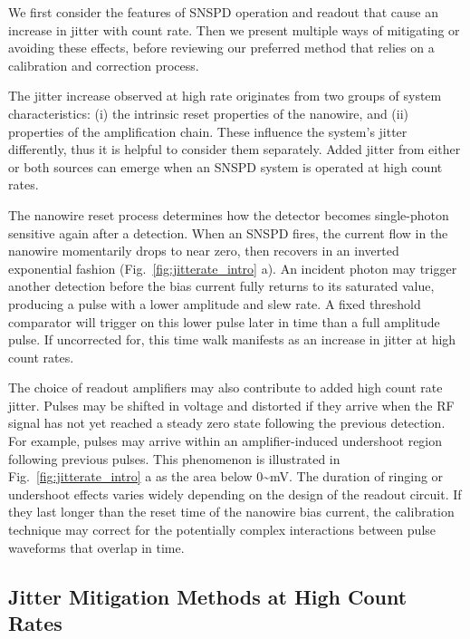 \documentclass[11pt]{caltech_thesis} %
\begin{document}
We first consider the features of SNSPD operation and readout that cause
an increase in jitter with count rate. Then we present multiple ways of
mitigating or avoiding these effects, before reviewing our preferred
method that relies on a calibration and correction process.

The jitter increase observed at high rate originates from two groups of
system characteristics: (i) the intrinsic reset properties of the
nanowire, and (ii) properties of the amplification chain. These
influence the system's jitter differently, thus it is helpful to
consider them separately. Added jitter from either or both sources can
emerge when an SNSPD system is operated at high count rates.

The nanowire reset process determines how the detector becomes
single-photon sensitive again after a detection. When an SNSPD fires,
the current flow in the nanowire momentarily drops to near zero, then
recovers in an inverted exponential fashion
(Fig.~\ref{fig:jitterate_intro} a). An incident photon may trigger
another detection before the bias current fully returns to its saturated
value, producing a pulse with a lower amplitude and slew rate. A fixed
threshold comparator will trigger on this lower pulse later in time than
a full amplitude pulse. If uncorrected for, this time walk manifests as
an increase in jitter at high count rates.

The choice of readout amplifiers may also contribute to added high count
rate jitter. Pulses may be shifted in voltage and distorted if they
arrive when the RF signal has not yet reached a steady zero state
following the previous detection. For example, pulses may arrive within
an amplifier-induced undershoot region following previous pulses. This
phenomenon is illustrated in Fig.~\ref{fig:jitterate_intro} a as the
area below 0\textasciitilde mV. The duration of ringing or undershoot
effects varies widely depending on the design of the readout circuit. If
they last longer than the reset time of the nanowire bias current, the
calibration technique may correct for the potentially complex
interactions between pulse waveforms that overlap in time.

\hypertarget{jitter-mitigation-methods-at-high-count-rates}{%
\subsection{Jitter Mitigation Methods at High Count
Rates}\label{jitter-mitigation-methods-at-high-count-rates}}
\end{document}
